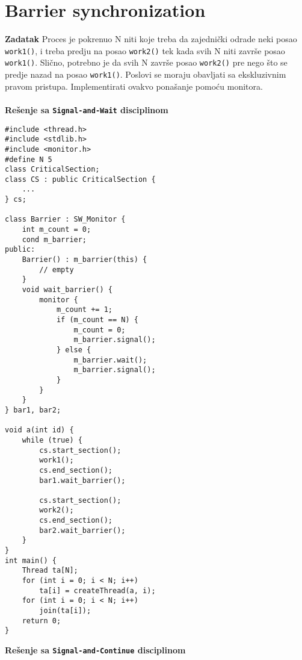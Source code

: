 \clearpage
\section{Barrier synchronization}
\textbf{\large Zadatak} Proces je pokrenuo $\mathrm N$ niti koje treba da zajedni\v{c}ki odrade neki posao \texttt{work1()}, i treba predju na posao \texttt{work2()} tek kada svih $\mathrm N$ niti zavr\v{s}e posao \texttt{work1()}. Sli\v{c}no, potrebno je da svih $\mathrm N$ zavr\v{s}e posao \texttt{work2()} pre nego \v{s}to se predje nazad na posao \texttt{work1()}. Poslovi se moraju obavljati sa ekskluzivnim pravom pristupa. Implementirati ovakvo pona\v{s}anje pomo\'{c}u monitora.
\\\\
\textbf{Re\v{s}enje sa \texttt{Signal-and-Wait} disciplinom}
\begin{lstlisting}
#include <thread.h>
#include <stdlib.h>
#include <monitor.h>
#define N 5
class CriticalSection;
class CS : public CriticalSection {
    ...
} cs;

class Barrier : SW_Monitor {
    int m_count = 0;
    cond m_barrier;
public:
    Barrier() : m_barrier(this) {
        // empty
    }
    void wait_barrier() {
        monitor {
            m_count += 1;
            if (m_count == N) {
                m_count = 0;
                m_barrier.signal();
            } else {
                m_barrier.wait();
                m_barrier.signal();
            }
        }
    }
} bar1, bar2;

void a(int id) {
    while (true) {
        cs.start_section();
        work1();
        cs.end_section();
        bar1.wait_barrier();

        cs.start_section();
        work2();
        cs.end_section();
        bar2.wait_barrier();
    }
}
int main() {
    Thread ta[N];
    for (int i = 0; i < N; i++) 
        ta[i] = createThread(a, i);
    for (int i = 0; i < N; i++) 
        join(ta[i]);
    return 0;
}

\end{lstlisting}
\textbf{Re\v{s}enje sa \texttt{Signal-and-Continue} disciplinom}
